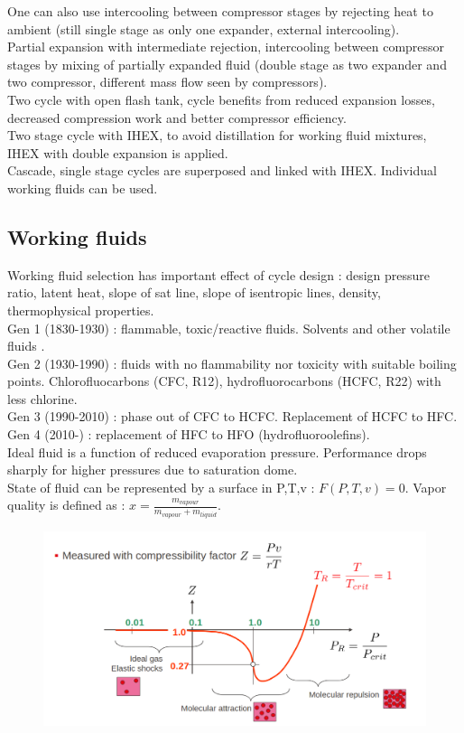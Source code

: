 \documentclass[../main.tex]{subfiles}
\begin{document}
One can also use intercooling between compressor stages by rejecting heat to ambient (still single stage as only one expander, external intercooling).\\

Partial expansion with intermediate rejection, intercooling between compressor stages by mixing of partially expanded fluid (double stage as two expander and two compressor, different mass flow seen by compressors). \\

Two cycle with open flash tank, cycle benefits from reduced expansion losses, decreased compression work and better compressor efficiency.\\

Two stage cycle with IHEX, to avoid distillation for working fluid mixtures, IHEX with double expansion is applied. \\

Cascade, single stage cycles are superposed and linked with IHEX. Individual working fluids can be used.


\subsection{Working fluids}
Working fluid selection has important effect of cycle design : design pressure ratio, latent heat, slope of sat line, slope of isentropic lines, density, thermophysical properties.\\
Gen 1 (1830-1930) : flammable, toxic/reactive fluids. Solvents and other volatile fluids .\\
Gen 2 (1930-1990) : fluids with no flammability nor toxicity with suitable boiling points. Chlorofluocarbons (CFC, R12), hydrofluorocarbons (HCFC, R22) with less chlorine.\\
Gen 3 (1990-2010) : phase out of CFC to HCFC. Replacement of HCFC to HFC.\\
Gen 4 (2010-) : replacement of HFC to HFO (hydrofluoroolefins). \\

Ideal fluid is a function of reduced evaporation pressure. Performance drops sharply for higher pressures due to saturation dome. \\
State of fluid can be represented by a surface in P,T,v : $F(P,T,v)=0$. Vapor quality is defined as : $x= \frac{m_{vapour}}{m_{vapour} + m_{liquid}}$.\\
\begin{figure}[hbt!]
    \centering
    \includegraphics[width=0.5\linewidth]{IMAGES/HP/Screenshot from 2025-04-03 10-04-55.png}
\end{figure}
\end{document}
